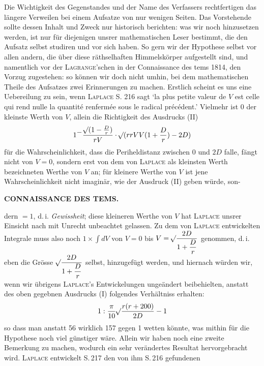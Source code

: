 Die Wichtigkeit des Gegenstandes und der Name des Verfassers rechtfertigen das längere Verweilen bei einem
Aufsatze von nur wenigen Seiten. Das Vorstehende sollte dessen Inhalt und Zweck nur historisch berichten:
was wir noch hinzusetzen werden, ist nur für diejenigen unsrer mathematischen Leser bestimmt, die den
Aufsatz selbst studiren und vor sich haben. So gern wir der Hypothese selbst vor allen andern, die über
diese räthselhaften Himmelskörper aufgestellt sind, und namentlich vor der \textsc{Lagrange}'schen in der
Connaissance des tems 1814, den Vorzug zugestehen: so können wir doch nicht umhin, bei dem mathematischen
Theile des Aufsatzes zwei Erinnerungen zu machen. Erstlich scheint es uns eine Uebereilung zu sein, wenn
\textsc{Laplace} S. 216 sagt `la plus petite valeur de $V$ est celle qui rend nulle la quantité renfermée
sous le radical précédent.' Vielmehr ist 0 der kleinste Werth von $V$, allein die Richtigkeit des
Ausdrucks (II)
\[1{}^{\displaystyle -}\frac{\mathord{{}^{}\!\surd}(1-\frac{D}{r})}{rV}\cdot\mathord{{}^{}\!\surd}(rrVV(1+\frac{D}{r})-2D)\]
für die Wahrscheinlichkeit, dass die Periheldistanz zwischen 0 und $2D$ falle, fängt nicht von $V=0$,
sondern erst von dem von \textsc{Laplace} als kleinsten Werth bezeichneten Werthe von $V$ an; für kleinere
Werthe von $V$ ist jene Wahrscheinlichkeit nicht imaginär, wie der Ausdruck (II) geben würde, son-
\par
\clearpage
\thispagestyle{empty}
\noindent{}%
\makebox[12mm][l]{}%
\parbox[t]{\dimexpr\linewidth-24mm\relax}{\centering\footnotesize\bfseries CONNAISSANCE DES TEMS.}%
\par\nobreak\medskip
\noindent dern $= 1$, d.\,i. \emph{Gewissheit}; diese kleineren Werthe von $V$ hat \textsc{Laplace} unsrer Einsicht nach mit
Unrecht unbeachtet gelassen. Zu dem von \textsc{Laplace} entwickelten Integrale muss also noch
$1\times\int dV$ von $V = 0$ bis $V = \mathord{{}^{}\!\surd}\dfrac{2D}{1+\dfrac{D}{r}}$ genommen, d.\,i. eben
die Grösse $\mathord{{}^{}\!\surd}\dfrac{2D}{1+\dfrac{D}{r}}$ selbst, hinzugefügt werden, und hiernach würden wir,
wenn wir übrigens \textsc{Laplace}'s Entwickelungen ungeändert beibehielten, anstatt des oben gegebnen
Ausdrucks (I) folgendes Verhältniss erhalten:
\[1 : \frac{\pi}{10}\mathord{{}^{}\!\surd}\frac{r(r+200)}{2D} - 1\]
so dass man anstatt 56 wirklich 157 gegen 1 wetten könnte, was mithin für die Hypothese noch viel
günstiger wäre. Allein wir haben noch eine zweite Bemerkung zu machen, wodurch ein sehr verändertes
Resultat hervorgebracht wird. \textsc{Laplace} entwickelt S.\,217 den von ihm S.\,216 gefundenen
